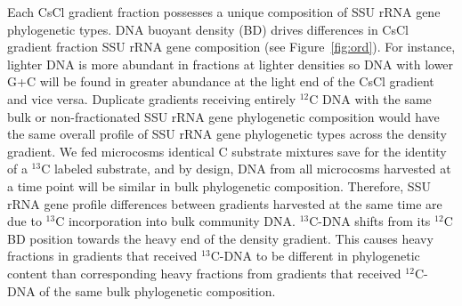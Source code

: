 Each CsCl gradient fraction possesses a unique composition of SSU rRNA gene
phylogenetic types. DNA buoyant density (BD) drives differences in CsCl
gradient fraction SSU rRNA gene composition (see Figure~\ref{fig:ord}). For
instance, lighter DNA is more abundant in fractions at lighter densities so DNA
with lower G+C will be found in greater abundance at the light end of the CsCl
gradient and vice versa. Duplicate gradients receiving entirely $^{12}$C DNA
with the same bulk or non-fractionated SSU rRNA gene phylogenetic composition
would have the same overall profile of SSU rRNA gene phylogenetic types across
the density gradient. We fed microcosms identical C substrate mixtures save for
the identity of a $^{13}$C labeled substrate, and by design, DNA from all
microcosms harvested at a time point will be similar in bulk phylogenetic
composition. Therefore, SSU rRNA gene profile differences between gradients
harvested at the same time are due to $^{13}$C incorporation into bulk
community DNA. $^{13}$C-DNA shifts from its $^{12}$C BD position towards the
heavy end of the density gradient. This causes heavy fractions in gradients
that received $^{13}$C-DNA to be different in phylogenetic content than
corresponding heavy fractions from gradients that received $^{12}$C-DNA of the
same bulk phylogenetic composition.

